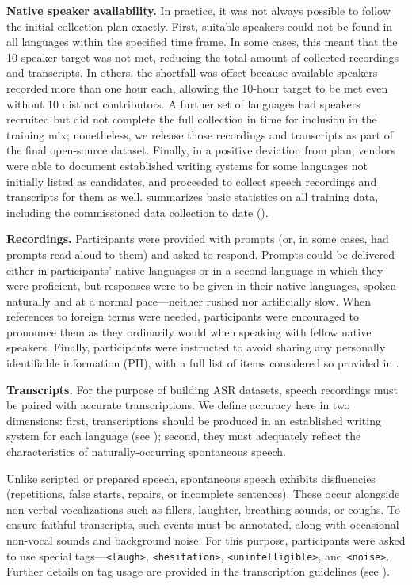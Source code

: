 \documentclass[]{fairmeta}
\begin{document}
\textbf{Native speaker availability.} In practice, it was not always possible to follow the initial collection plan exactly. First, suitable speakers could not be found in all languages within the specified time frame. In some cases, this meant that the 10-speaker target was not met, reducing the total amount of collected recordings and transcripts. In others, the shortfall was offset because available speakers recorded more than one hour each, allowing the 10-hour target to be met even without 10 distinct contributors. A further set of languages had speakers recruited but did not complete the full collection in time for inclusion in the training mix; nonetheless, we release those recordings and transcripts as part of the final open-source dataset. Finally, in a positive deviation from plan, vendors were able to document established writing systems for some languages not initially listed as candidates, and proceeded to collect speech recordings and transcripts for them as well.  summarizes basic statistics on all training data, including the commissioned data collection to date (\vendorcorpus).

\textbf{Recordings.} Participants were provided with prompts (or, in some cases, had prompts read aloud to them) and asked to respond. Prompts could be delivered either in participants’ native languages or in a second language in which they were proficient, but responses were to be given in their native languages, spoken naturally and at a normal pace—neither rushed nor artificially slow. When references to foreign terms were needed, participants were encouraged to pronounce them as they ordinarily would when speaking with fellow native speakers. Finally, participants were instructed to avoid sharing any personally identifiable information (PII), with a full list of items considered so provided in .

\textbf{Transcripts.} For the purpose of building ASR datasets, speech recordings must be paired with accurate transcriptions. We define accuracy here in two dimensions: first, transcriptions should be produced in an established writing system for each language (see ); second, they must adequately reflect the characteristics of naturally-occurring spontaneous speech.

Unlike scripted or prepared speech, spontaneous speech exhibits disfluencies (repetitions, false starts, repairs, or incomplete sentences). These occur alongside non-verbal vocalizations such as fillers, laughter, breathing sounds, or coughs. To ensure faithful transcripts, such events must be annotated, along with occasional non-vocal sounds and background noise. For this purpose, participants were asked to use special tags—\texttt{<laugh>}, \texttt{<hesitation>}, \texttt{<unintelligible>}, and \texttt{<noise>}. Further details on tag usage are provided in the transcription guidelines (see ).
\end{document}
